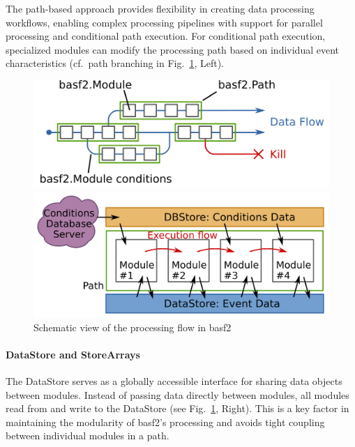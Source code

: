 The path-based approach provides flexibility in creating data processing workflows, enabling complex processing pipelines with support for parallel processing and conditional path execution. 
For conditional path execution, specialized modules can modify the processing path based on individual event characteristics (cf.\ path branching in Fig.\ \ref{fig:basf2-path-schema}, Left).

\begin{figure}[h]
  \centering
  \begin{minipage}[c]{0.5\textwidth}
    \centering
    \includegraphics[width=\linewidth]{static/basf2-path-schema-left.png}
  \end{minipage}%
  \vrule%
  \begin{minipage}[c]{0.5\textwidth}
    \centering
    \includegraphics[width=\linewidth]{static/basf2-path-schema-right.png}
  \end{minipage}
  \caption{Schematic view of the processing flow in basf2 \cite{basf2-path-schema}}
  \label{fig:basf2-path-schema}
\end{figure}

\paragraph{DataStore and StoreArrays}
The DataStore serves as a globally accessible interface for sharing data objects between modules.
Instead of passing data directly between modules, all modules read from and write to the DataStore (see Fig.\ \ref{fig:basf2-path-schema}, Right). 
This is a key factor in maintaining the modularity of basf2's processing and avoids tight coupling between individual modules in a path.


